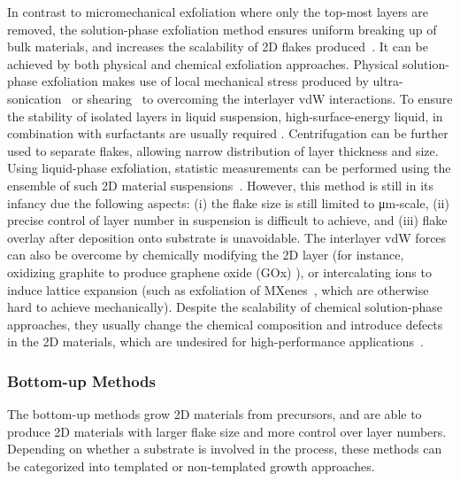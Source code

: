 In contrast to micro\-mechanical exfoliation where only the top-most
layers are removed, the solution-phase exfoliation method ensures
uniform breaking up of bulk materials, and increases the scalability
of 2D flakes produced~\autocite{Coleman_2012_rev}.
It can be achieved by
both physical and chemical exfoliation approaches.
%
Physical solution-phase exfoliation makes use of local mechanical
stress produced by ultra-sonication~\autocite{Xia_2013_liquidphase}
or shearing~\autocite{Paton_2014_shearing} to overcoming the interlayer
vdW interactions. To ensure the stability of isolated layers in 
liquid suspension, high-surface-energy liquid, in combination with
surfactants are usually required
\autocite{Coleman_2012_rev,Paton_2014_shearing,Hanlon_2015_shear,Backes_2014_mos2,Shih_2010_exf,Shih_2011_bitri}.
%
Centrifugation can be further used to separate flakes, allowing narrow
distribution of layer thickness and size.
%
Using liquid-phase exfoliation,
statistic measurements
can be performed using the ensemble of such 2D material
suspensions~\autocite{Backes_2014_mos2}.
%
However, this method is still in its infancy due the following aspects:
(i) the flake size is still limited to μm-scale, (ii) precise control
of layer number in suspension is difficult to achieve, and (iii) flake overlay
after deposition onto substrate is unavoidable.
%
The interlayer vdW forces can also be overcome by chemically modifying
the 2D layer (for instance, oxidizing graphite to produce graphene
oxide (GOx) \autocite{Chen_2013_GO}), or intercalating ions
to induce lattice expansion (such as exfoliation of
MXenes~\autocite{Naguib_2011_Mxene}, which are otherwise hard to achieve
mechanically). Despite the scalability of chemical solution-phase
approaches, they usually change the chemical composition and
introduce defects in the 2D materials, which are undesired for
high-performance applications~\autocite{Lin_2019_gr_rev_growth}.

\subsubsection{Bottom-up Methods}
\label{sec:bottom-up-methods}

The bottom-up methods grow 2D materials from precursors, and are able
to produce 2D materials with larger flake size and more control over
layer numbers.
%
Depending on whether a substrate is involved in the
process, these methods can be categorized into templated or
non-templated growth approaches.

